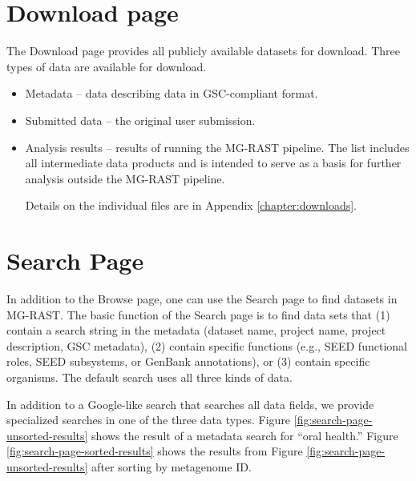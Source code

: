 \documentclass[12pt,fullpage]{report}
\begin{document}
\section{Download page}

The Download page provides all publicly available datasets for download.
Three types of data are available for download.

\begin{itemize}
\item Metadata --
data describing data in GSC-compliant format.

\item Submitted data --
the original user submission.

\item Analysis results --
results of running the MG-RAST pipeline. The list includes all intermediate data products and is intended to serve as a basis for further analysis outside the MG-RAST pipeline.

Details on the individual files are in Appendix \ref{chapter:downloads}.
\end{itemize}
\section{Search Page}
\label{section:search-page}

In addition to the Browse page, one can use
the Search page to find datasets in MG-RAST.
The basic function of the Search page is to find data sets that (1) contain a search string in the metadata (dataset name, project name, project description, GSC metadata), (2) contain specific functions (e.g., SEED functional roles, SEED subsystems, or GenBank annotations), or (3) contain specific organisms. The default search uses all three kinds of data.

In addition to a Google-like search that searches all data fields, we provide specialized searches in one of the three data types. Figure
\ref{fig:search-page-unsorted-results} shows the result of a metadata search for ``oral health.''
Figure \ref{fig:search-page-sorted-results} shows the results from Figure \ref{fig:search-page-unsorted-results} after sorting by metagenome ID.
\end{document}
